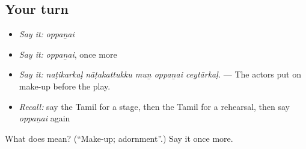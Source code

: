 \subsection*{Your turn}
\begin{itemize}
\raggedright
  \item \emph{Say it:} \emph{oppaṉai}
  \item \emph{Say it:} \emph{oppaṉai}, once more
  \item \emph{Say it:} \emph{naṭikarkaḷ nāṭakattukku muṉ oppaṉai ceytārkaḷ.} — The actors put on make-up before the play.
  \item \emph{Recall:} say the Tamil for a stage, then the Tamil for a rehearsal, then say \emph{oppaṉai} again
\end{itemize}

\begin{tcolorbox}[breakable,colback=teal!4,colframe=teal!35!black,title={Before you move on}]
What does  mean? (\textquotedblleft{}Make-up; adornment\textquotedblright{}.) Say it once more.
\end{tcolorbox}
